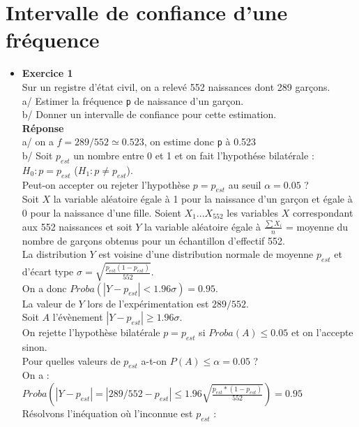 \documentclass[a4paper,11pt]{book}
\begin{document}
\section{Intervalle de confiance d'une fr\'equence}
\begin{itemize}
\item {\bf Exercice 1}\\
Sur un registre d'\'etat civil, on a relev\'e 552 naissances dont 289 
gar\c{c}ons. \\
a/ Estimer la fr\'equence {\tt p} de naissance d'un gar\c{c}on.\\
b/ Donner un intervalle de confiance pour cette estimation.\\
{\bf R\'eponse}\\
a/ on a $f=289/552\simeq 0.523$, on estime donc {\tt p}  \`a 0.523 \\
b/ Soit $p_{est}$ un nombre entre 0 et 1 et on fait l'hypoth\'ese bilat\'erale :\\
$H_0: p=p_{est}$ ($H_1: p \neq p_{est}$).\\
Peut-on accepter ou rejeter l'hypoth\`ese $p=p_{est}$ au seuil $\alpha=0.05$ ?\\
Soit $X$ la variable al\'eatoire \'egale \`a 1 pour la naissance d'un gar\c{c}on et \'egale \`a 0 pour la naissance d'une fille. Soient $X_1...X_{552}$ les variables $X$  
correspondant aux 552 naissances et soit $Y$ la variable al\'eatoire \'egale \`a $\frac{\sum X_i}{n}$ = moyenne du nombre de gar\c{c}ons obtenus pour 
un \'echantillon d'effectif 552.\\
La distribution $Y$ est voisine d'une distribution normale de moyenne $p_{est}$
 et d'\'ecart type $\sigma=\sqrt{\frac{p_{est}(1-p_{est})}{552}}$.\\
On a donc $Proba(|Y-p_{est}|<1.96\sigma)=0.95$.\\
La valeur de $Y$ lors de l'exp\'erimentation est $289/552$.\\
Soit $A$ l'\'ev\`enement $|Y-p_{est}|\geq 1.96\sigma$.\\ 
On rejette  l'hypoth\`ese bilat\'erale $p=p_{est}$ si $Proba(A) \leq 0.05$ et 
on l'accepte sinon.\\
Pour quelles valeurs de $p_{est}$ 
a-t-on $P(A) \leq \alpha=0.05$ ? \\
On a :\\
$Proba(|Y-p_{est}|=|289/552-p_{est}|\leq 1.96\sqrt{\frac{p_{est}*(1-p_{est})}{552}})=0.95$\\
R\'esolvons l'in\'equation o\`u l'inconnue est $p_{est}$ :\\

\end{itemize}
\end{document}
